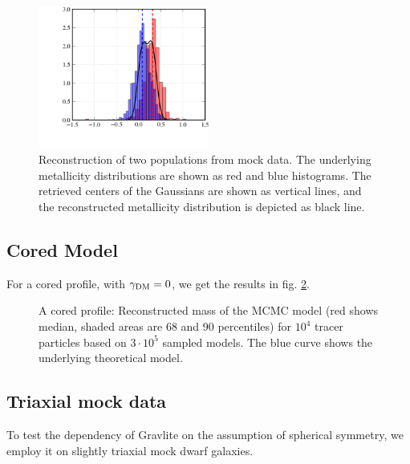 \begin{figure}
    \begin{center}
        \hspace{-7mm}
        \includegraphics[width=0.5\textwidth]{fig/pymcmetals.png}
        \caption{Reconstruction of two populations from mock data. The
          underlying metallicity distributions are shown as red and
          blue histograms. The retrieved centers of the Gaussians are
          shown as vertical lines, and the reconstructed metallicity
          distribution is depicted as black line.}
        \label{fig:pymcmetal}
    \end{center}
\end{figure}

 

\subsection{Cored Model}
For a cored profile, with $\gamma_{\rm DM}=0$, we get the results in
fig. \ref{fig:core}.

\begin{figure}
    \begin{center}
        \hspace{-7mm}
        \caption{A cored profile: Reconstructed mass of the MCMC model
          (red shows median, shaded areas are 68 and 90 percentiles)
          for $10^4$ tracer particles based on $3\cdot10^5$ sampled
          models. The blue curve shows the underlying theoretical
          model.}
        \label{fig:core}
    \end{center}
\end{figure}


\subsection{Triaxial mock data}
To test the dependency of {\sc Gravlite} on the assumption of
spherical symmetry, we employ it on slightly triaxial mock dwarf
galaxies.

